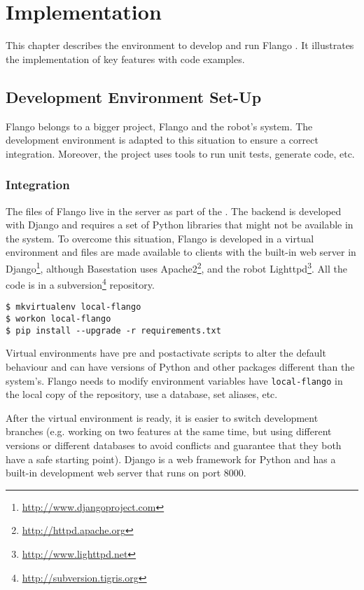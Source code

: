 \chapter{Implementation}
\label{chap:implementation}
This chapter describes the environment to develop and run Flango \cm.
It illustrates the implementation of key features with code examples.

\section{Development Environment Set-Up}
Flango \cm belongs to a bigger project, Flango and the robot's system.
The development environment is adapted to this situation to ensure a correct integration.
Moreover, the project uses tools to run unit tests, generate code, etc.

\subsection*{Integration}
The files of Flango \cm live in the server as part of the \flangobe .
The backend is developed with Django and requires a set of Python libraries that might not be available in the system.
To overcome this situation, Flango is developed in a virtual environment and files are made available to clients with the built-in web server in Django\footnote{\url{http://www.djangoproject.com}}, although Basestation uses Apache2\footnote{\url{http://httpd.apache.org}}, and the robot Lighttpd\footnote{\url{http://www.lighttpd.net}}.
All the code is in a subversion\footnote{\url{http://subversion.tigris.org}} repository.

\begin{lstlisting}[caption=Creation of virtual environments, label=virtual-env]
$ mkvirtualenv local-flango
$ workon local-flango
$ pip install --upgrade -r requirements.txt
\end{lstlisting}

Virtual environments have pre and postactivate scripts to alter the default behaviour and can have versions of Python and other packages different than the system's.
Flango needs to modify environment variables have \texttt{local-flango} in the local copy of the repository, use a database, set aliases, etc.

After the virtual environment is ready, it is easier to switch development branches (e.g. working on two features at the same time, but using different versions or different databases to avoid conflicts and guarantee that they both have a safe starting point).
Django is a web framework for Python and has a built-in development web server that runs on port 8000.

